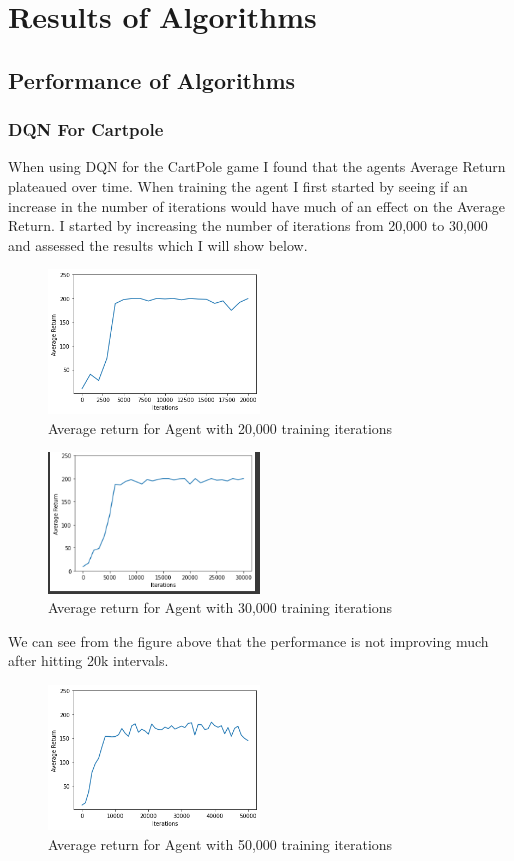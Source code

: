 \documentclass[conference]{IEEEtran}
\begin{document}
\section{Results of Algorithms}
\subsection{Performance of Algorithms}
\subsubsection{DQN For Cartpole}
When using DQN for the CartPole game I found that the agents Average Return plateaued over time.  When training the agent I first started by seeing if an increase in the number of iterations would have much of an effect on the Average Return.  I started by increasing the number of iterations from 20,000 to 30,000 and assessed the results which I will show below.
\begin{figure}[h]
\caption{Average return for Agent with 20,000 training iterations}
\centering
\includegraphics[width=0.5\textwidth]{Images/DQN20k.png}
\end{figure}
\begin{figure}[H]
\caption{Average return for Agent with 30,000 training iterations}
\centering
\includegraphics[width=0.5\textwidth]{Images/DQN30k.png}
\end{figure}
We can see from the figure above that the performance is not improving much after hitting 20k intervals. 
\begin{figure}[H]
\caption{Average return for Agent with 50,000 training iterations}
\centering
\includegraphics[width=0.5\textwidth]{Images/DQN50k.png}
\end{figure}
\end{document}
